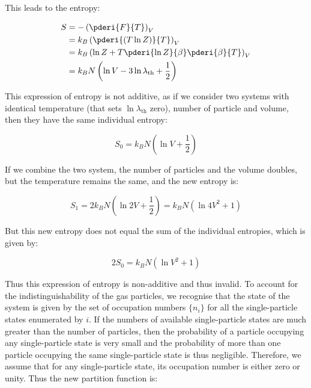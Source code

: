 \documentclass[12pt]{article}
\begin{document}
This leads to the entropy:

\begin{equation}
    \begin{split}
        S &= - \left( \pderi{F}{T} \right)_{V} \\
        &= k_{B} \left( \pderi{(T \ln{Z})}{T} \right)_{V} \\
        &= k_{B} \left( \ln{Z} + T \pderi{\ln{Z}}{\beta} \pderi{\beta}{T} \right)_{V} \\
        &= k_{B} N \left( \ln{V} - 3\ln{\lambda_{\text{th}}} + \frac{1}{2} \right) \\
    \end{split}
\end{equation}

This expression of entropy is not additive, as if we consider two systems with identical temperature (that sets $\ln{\lambda_{\text{th}}}$ zero), number of particle and volume, then they have the same individual entropy:

\begin{equation}
    S_{0} = k_{B} N \left( \ln{V} + \frac{1}{2} \right)
\end{equation}

If we combine the two system, the number of particles and the volume doubles, but the temperature remains the same, and the new entropy is:

\begin{equation}
    S_{1} = 2 k_{B} N \left( \ln{2V} + \frac{1}{2} \right) = k_{B} N \left( \ln{4V^2} + 1 \right)
\end{equation}

But this new entropy does not equal the sum of the individual entropies, which is given by:

\begin{equation}
    2S_{0} = k_{B} N \left( \ln{V^2} + 1 \right)
\end{equation}

Thus this expression of entropy is non-additive and thus invalid. To account for the indistinguishability of the gas particles, we recognise that the state of the system is given by the set of occupation numbers $\{n_{i}\}$ for all the single-particle states enumerated by $i$. If the numbers of available single-particle states are much greater than the number of particles, then the probability of a particle occupying any single-particle state is very small and the probability of more than one particle occupying the same single-particle state is thus negligible. Therefore, we assume that for any single-particle state, its occupation number is either zero or unity. Thus the new partition function is:
\end{document}
